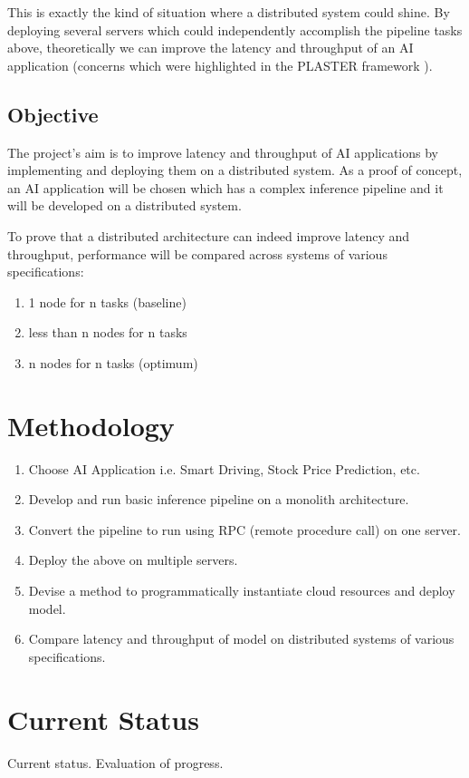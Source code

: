 \documentclass{report}
\begin{document}
This is exactly the kind of situation where a distributed system could shine. By deploying several servers which could independently accomplish the pipeline tasks above, theoretically we can improve the latency and throughput of an AI application (concerns which were highlighted in the PLASTER framework \cite{Teich2018}).

\section{Objective}
The project's aim is to improve latency and throughput of AI applications by implementing and deploying them on a distributed system. As a proof of concept, an AI application will be chosen which has a complex inference pipeline and it will be developed on a distributed system.

To prove that a distributed architecture can indeed improve latency and throughput, performance will be compared across systems of various specifications:
\begin{enumerate}
  \item 1 node for n tasks (baseline)
  \item less than n nodes for n tasks
  \item n nodes for n tasks (optimum)
\end{enumerate}

\chapter{Methodology}
\begin{enumerate}
  \item Choose AI Application i.e. Smart Driving, Stock Price Prediction, etc.
  \item Develop and run basic inference pipeline on a monolith architecture.
  \item Convert the pipeline to run using RPC (remote procedure call) on one server.
  \item Deploy the above on multiple servers.
  \item Devise a method to programmatically instantiate cloud resources and deploy model.
  \item Compare latency and throughput of model on distributed systems of various specifications.
\end{enumerate}

\chapter{Current Status}
Current status. Evaluation of progress.
\end{document}
